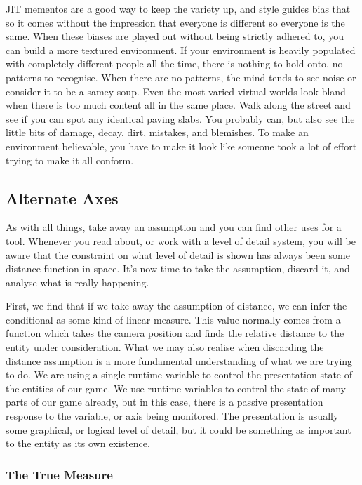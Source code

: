 \documentclass[a4paper,12pt]{article}
\begin{document}
JIT mementos are a good way to keep the variety up, and style guides bias that so it comes without the impression that everyone is different so everyone is the same.
When these biases are played out without being strictly adhered to, you can build a more textured environment.
If your environment is heavily populated with completely different people all the time, there is nothing to hold onto, no patterns to recognise.
When there are no patterns, the mind tends to see noise or consider it to be a samey soup.
Even the most varied virtual worlds look bland when there is too much content all in the same place.
Walk along the street and see if you can spot any identical paving slabs.
You probably can, but also see the little bits of damage, decay, dirt, mistakes, and blemishes.
To make an environment believable, you have to make it look like someone took a lot of effort trying to make it all conform.

\subsection{Alternate Axes}

As with all things, take away an assumption and you can find other uses for a tool.
Whenever you read about, or work with a level of detail system, you will be aware that the constraint on what level of detail is shown has always been some distance function in space.
It's now time to take the assumption, discard it, and analyse what is really happening.

First, we find that if we take away the assumption of distance, we can infer the conditional as some kind of linear measure.
This value normally comes from a function which takes the camera position and finds the relative distance to the entity under consideration.
What we may also realise when discarding the distance assumption is a more fundamental understanding of what we are trying to do.
We are using a single runtime variable to control the presentation state of the entities of our game.
We use runtime variables to control the state of many parts of our game already, but in this case, there is a passive presentation response to the variable, or axis being monitored.
The presentation is usually some graphical, or logical level of detail, but it could be something as important to the entity as its own existence.

\subsubsection{The True Measure}
\end{document}
